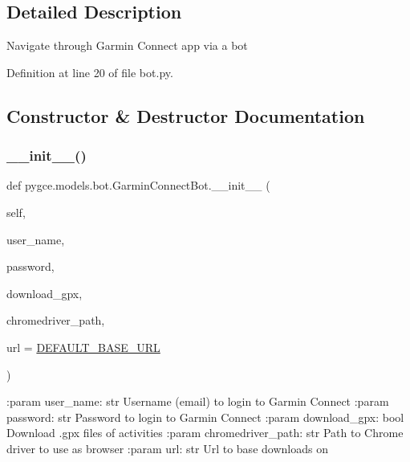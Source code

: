 \subsection{Detailed Description}
\begin{DoxyVerb}Navigate through Garmin Connect app via a bot \end{DoxyVerb}
 

Definition at line 20 of file bot.\+py.



\subsection{Constructor \& Destructor Documentation}
\mbox{\label{classpygce_1_1models_1_1bot_1_1_garmin_connect_bot_aeb909c53e6a647b5e8419d4877ba5b6d}} 
\subsubsection{\texorpdfstring{\+\_\+\+\_\+init\+\_\+\+\_\+()}{\_\_init\_\_()}}
{\footnotesize\ttfamily def pygce.\+models.\+bot.\+Garmin\+Connect\+Bot.\+\_\+\+\_\+init\+\_\+\+\_\+ (\begin{DoxyParamCaption}\item[{}]{self,  }\item[{}]{user\+\_\+name,  }\item[{}]{password,  }\item[{}]{download\+\_\+gpx,  }\item[{}]{chromedriver\+\_\+path,  }\item[{}]{url = {\ttfamily \hyperlink{classpygce_1_1models_1_1bot_1_1_garmin_connect_bot_a860621296516b8e3793321d0773e30f3}{D\+E\+F\+A\+U\+L\+T\+\_\+\+B\+A\+S\+E\+\_\+\+U\+RL}} }\end{DoxyParamCaption})}

\begin{DoxyVerb}:param user_name: str
    Username (email) to login to Garmin Connect
:param password: str
    Password to login to Garmin Connect
:param download_gpx: bool
    Download .gpx files of activities
:param chromedriver_path: str
    Path to Chrome driver to use as browser
:param url: str
    Url to base downloads on
\end{DoxyVerb}
 

